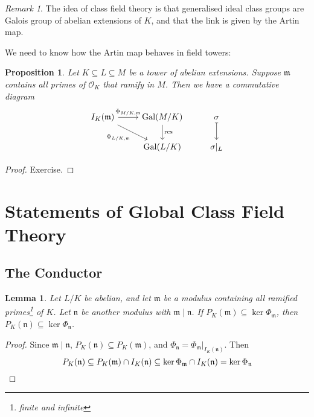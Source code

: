 \documentclass[11pt]{article}
\theoremstyle{definition}
\theoremstyle{plain}
\newtheorem{proposition}[definition]{Proposition}
\newtheorem{lemma}[definition]{Lemma}
\theoremstyle{remark}
\newtheorem{remark}[definition]{Remark}
\DeclareMathOperator{\Gal}{Gal}
\DeclareMathOperator{\res}{res}
\newcommand{\cO}{\mathcal{O}}
\newcommand{\fm}{\mathfrak{m}}
\newcommand{\fn}{\mathfrak{n}}
\begin{document}
\begin{remark}\label{rem:2_25}
    The idea of class field theory is that generalised ideal class groups are Galois group of abelian extensions of $K$, and that the link is given by the Artin map.
\end{remark}

\noindent We need to know how the Artin map behaves in field towers:

\begin{proposition}\label{prop:2_26}
    Let $K \subseteq L \subseteq M$ be a tower of abelian extensions. Suppose $\fm$ contains all primes of $\cO_K$ that ramify in $M$. Then we have a commutative diagram
    \begin{equation*}
    \begin{tikzcd}
        I_K(\fm) \arrow[r, "\Phi_{M/K,\fm}"] \arrow[rd, "\Phi_{L/K,\fm}"'] & \Gal(M/K) \arrow[d, "\res"] & \sigma \arrow[d, mapsto]\\
                                                                           & \Gal(L/K) & \sigma \vert_L
    \end{tikzcd}
    \end{equation*}
\end{proposition}
\begin{proof}
    Exercise.
\end{proof}

\section{Statements of Global Class Field Theory}

\subsection{The Conductor}

\begin{lemma}\label{lem:3_1}
    Let $L/K$ be abelian, and let $\fm$ be a modulus containing all ramified primes\footnote{finite and infinite} of $K$. Let $\fn$ be another modulus with $\fm \mid \fn$. If $P_K(\fm) \subseteq \ker \Phi_\fm$, then $P_K(\fn) \subseteq \ker \Phi_\fn$.
\end{lemma}
\begin{proof}
    Since $\fm \mid \fn$, $P_K(\fn) \subseteq P_K(\fm)$, and $\Phi_\fn = \Phi_\fm \vert_{I_K(\fn)}$. Then
    \begin{equation*}
        P_K(\fn) \subseteq P_K(\fm) \cap I_K(\fn) \subseteq \ker \Phi_\fm \cap I_K(\fn) = \ker \Phi_\fn \qedhere
    \end{equation*}
\end{proof}
\end{document}
